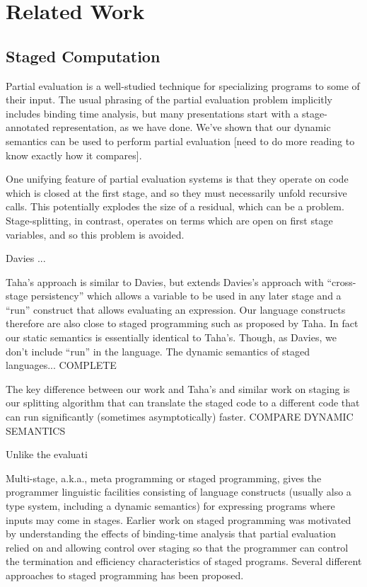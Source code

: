 
\section{Related Work}

\subsection {Staged Computation}
Partial evaluation is a well-studied technique for specializing programs to some of their input.  
The usual phrasing of the partial evaluation problem implicitly includes binding time analysis,
but many presentations start with a stage-annotated representation, as we have done.
We've shown that our dynamic semantics can be used to perform partial evaluation 
[need to do more reading to know exactly how it compares].

One unifying feature of partial evaluation systems is that they operate on code which is closed at the first stage,
and so they must necessarily unfold recursive calls.
This potentially explodes the size of a residual, which can be a problem.
Stage-splitting, in contrast, operates on terms which are open on first stage variables,
and so this problem is avoided.


Davies ...  

Taha's approach is similar to Davies, but extends Davies's approach
with ``cross-stage persistency'' which allows a variable to be used in
any later stage and a ``run'' construct that allows evaluating an
expression.  Our language constructs therefore are also close to
staged programming such as proposed by Taha.  In fact our static
semantics is essentially identical to Taha's.  Though, as Davies, we
don't include ``run'' in the language.  The dynamic semantics of
staged languages... COMPLETE


The key difference between our work and Taha's and similar work on
staging is our splitting algorithm that can translate the staged code
to a different code that can run significantly (sometimes
asymptotically) faster. COMPARE DYNAMIC SEMANTICS

 Unlike the evaluati


Multi-stage, a.k.a., meta programming or staged programming, gives the
programmer linguistic facilities consisting of language constructs
(usually also a type system, including a dynamic semantics) for
expressing programs where inputs may come in stages.  Earlier work on
staged programming was motivated by understanding the effects of
binding-time analysis that partial evaluation relied on and allowing
control over staging so that the programmer can control the
termination and efficiency characteristics of staged programs.
Several different approaches to staged programming has been proposed.

